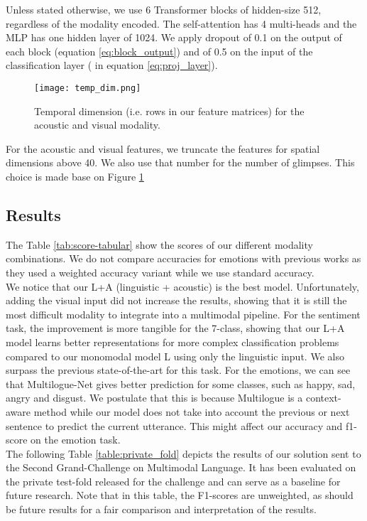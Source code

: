 \documentclass[11pt,a4paper]{article}
\begin{document}
Unless stated otherwise, we use 6 Transformer blocks of hidden-size 512, regardless of the modality encoded. The self-attention has 4 multi-heads and the MLP has one hidden layer of 1024. We apply dropout of 0.1 on the output of each block (equation \ref{eq:block_output}) and of 0.5 on the input of the classification layer ( in equation \ref{eq:proj_layer}). \\



\begin{figure}[!ht] 
\centering
\texttt{[image: temp\_dim.png]}
\caption{Temporal dimension (i.e. rows in our feature matrices) for the acoustic and visual modality.}
\label{fig:tempdim}
\end{figure}

For the acoustic and visual features, we truncate the features for spatial dimensions above 40. We also use that number for the number of glimpses. This choice is made base on Figure \ref{fig:tempdim}

\subsection{Results}
The Table \ref{tab:score-tabular} show the scores of our different modality combinations. We do not compare accuracies for emotions with previous works as they used a weighted accuracy variant while we use standard accuracy. \\

We notice that our L+A (linguistic + acoustic) is the best model. Unfortunately, adding the visual input did not increase the results, showing that it is still the most difficult modality to integrate into a multimodal pipeline. For the sentiment task, the improvement is more tangible for the 7-class, showing that our L+A model learns better representations for more complex classification problems compared to our monomodal model L using only the linguistic input. We also surpass the previous state-of-the-art for this task. For the emotions, we can see that Multilogue-Net gives better prediction for some classes, such as happy, sad, angry and disgust. We postulate that this is because Multilogue is a context-aware method while our model does not take into account the previous or next sentence to predict the current utterance. This might affect our accuracy and f1-score on the emotion task. \\

The following Table \ref{table:private_fold} depicts the results of our solution sent to the Second Grand-Challenge on Multimodal Language. It has been evaluated on the private test-fold released for the challenge and can serve as a baseline for future research. Note that in this table, the F1-scores are unweighted, as should be future results for a fair comparison and interpretation of the results. 
\end{document}
